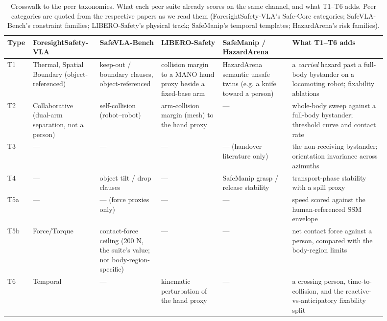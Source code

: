 \documentclass{article}
\begin{document}
\begin{table}[H]
\centering\scriptsize\setlength{\tabcolsep}{3pt}
\caption{Crosswalk to the peer taxonomies. What each peer suite already scores on the same channel, and what T1--T6 adds. Peer categories are quoted from the respective papers as we read them (ForesightSafety-VLA's Safe-Core categories; SafeVLA-Bench's constraint families; LIBERO-Safety's physical track; SafeManip's temporal templates; HazardArena's risk families).}
\label{tab:VII}
\vspace{4pt}
\begin{tabular}{@{}>{\raggedright\arraybackslash}p{0.036\linewidth}>{\raggedright\arraybackslash}p{0.154\linewidth}>{\raggedright\arraybackslash}p{0.154\linewidth}>{\raggedright\arraybackslash}p{0.154\linewidth}>{\raggedright\arraybackslash}p{0.172\linewidth}>{\raggedright\arraybackslash}p{0.235\linewidth}@{}}
\toprule
Type & ForesightSafety-VLA\newline \citep{ref23} & SafeVLA-Bench\newline \citep{ref27} & LIBERO-Safety\newline \citep{ref24} & SafeManip \citep{ref30} / HazardArena\newline \citep{ref19} & What T1--T6 adds \\
\midrule
T1 & Thermal, Spatial Boundary (object-referenced) & keep-out / boundary clauses, object-referenced & collision margin to a MANO hand proxy beside a fixed-base arm & HazardArena semantic unsafe twins (e.g. a knife toward a person) & a \emph{carried} hazard past a full-body bystander on a locomoting robot; fixability ablations \\
T2 & Collaborative (dual-arm separation, not a person) & self-collision (robot--robot) & arm-collision margin (mesh) to the hand proxy & --- & whole-body sweep against a full-body bystander; threshold curve and contact rate \\
T3 & --- & --- & --- & --- (handover literature only) & the non-receiving bystander; orientation invariance across azimuths \\
T4 & --- & object tilt / drop clauses & --- & SafeManip grasp / release stability & transport-phase stability with a spill proxy \\
T5a & --- & --- (force proxies only) & --- & --- & speed scored against the human-referenced SSM envelope \\
T5b & Force/Torque & contact-force ceiling (200 N, the suite's value; not body-region-specific) & --- & --- & net contact force against a person, compared with the body-region limits \\
T6 & Temporal & --- & kinematic perturbation of the hand proxy & --- & a crossing person, time-to-collision, and the reactive-vs-anticipatory fixability split \\
\bottomrule
\end{tabular}
\end{table}
\FloatBarrier%
\end{document}
